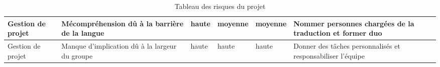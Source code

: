 \begin{table}[h!]
\begin{tabularx}{\textwidth}{|p{2cm}|p{3.2cm}|p{2.6cm}|p{2cm}|p{2cm}|p{3cm}|}
      \hline
      Gestion de projet  & Mécompréhension dû à la barrière de la langue  & haute                & moyenne          & moyenne                   & Nommer personnes chargées de la traduction et former duo    \\
      \hline
      Gestion de projet  & Manque d'implication dû à la largeur du groupe & haute                & haute            & haute                     & Donner des tâches personnalisés et responsabiliser l'équipe \\
      \hline
   \end{tabularx}
   \caption{Tableau des risques du projet}
\end{table}
